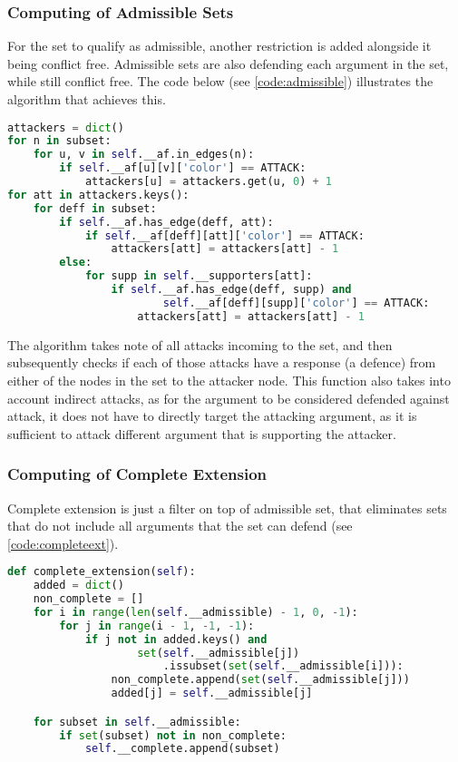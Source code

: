         \subsubsection{Computing of Admissible Sets}
            For the set to qualify as admissible, another restriction is added alongside it being conflict free. Admissible sets are also defending each argument in the set, while still conflict free. The code below (see \cref{code:admissible}) illustrates the algorithm that achieves this.
            
            \begin{lstlisting}[language=Python, caption=Admissible Arguments, label=code:admissible]
attackers = dict()
for n in subset:
    for u, v in self.__af.in_edges(n):
        if self.__af[u][v]['color'] == ATTACK:
            attackers[u] = attackers.get(u, 0) + 1
for att in attackers.keys():
    for deff in subset:
        if self.__af.has_edge(deff, att):
            if self.__af[deff][att]['color'] == ATTACK:
                attackers[att] = attackers[att] - 1
        else:
            for supp in self.__supporters[att]:
                if self.__af.has_edge(deff, supp) and
                        self.__af[deff][supp]['color'] == ATTACK:
                    attackers[att] = attackers[att] - 1
            \end{lstlisting}
            
            The algorithm takes note of all attacks incoming to the set, and then subsequently checks if each of those attacks have a response (a defence) from either of the nodes in the set to the attacker node. This function also takes into account indirect attacks, as for the argument to be considered defended against attack, it does not have to directly target the attacking argument, as it is sufficient to attack different argument that is supporting the attacker.
            
        \subsubsection{Computing of Complete Extension}
            Complete extension is just a filter on top of admissible set, that eliminates sets that do not include all arguments that the set can defend (see \cref{code:completeext}).
        
            \begin{lstlisting}[language=Python, caption=Complete Extension, label=code:completeext]
def complete_extension(self):
    added = dict()
    non_complete = []
    for i in range(len(self.__admissible) - 1, 0, -1):
        for j in range(i - 1, -1, -1):
            if j not in added.keys() and 
                    set(self.__admissible[j])
                        .issubset(set(self.__admissible[i])):
                non_complete.append(set(self.__admissible[j]))
                added[j] = self.__admissible[j]

    for subset in self.__admissible:
        if set(subset) not in non_complete:
            self.__complete.append(subset)
            \end{lstlisting}
            
